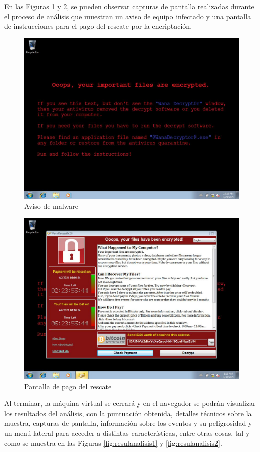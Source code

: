 En las Figuras \ref{fig:avisomalware} y \ref{fig:pagorescate}, se pueden observar capturas de pantalla realizadas durante el proceso de análisis que muestran un aviso de equipo infectado y una pantalla de instrucciones para el pago del rescate por la encriptación.

\begin{figure}[h!]
\begin{center}
\includegraphics[width=0.72\linewidth]{images/wannacry1.jpg}
\end{center}
\caption{Aviso de malware}
\label{fig:avisomalware}
\end{figure}

\begin{figure}[h!]
\begin{center}
\includegraphics[width=0.72\linewidth]{images/wannacry2.jpg}
\end{center}
\caption{Pantalla de pago del rescate}
\label{fig:pagorescate}
\end{figure}

Al terminar, la máquina virtual se cerrará y en el navegador se podrán visualizar los resultados del análisis, con la puntuación obtenida, detalles técnicos sobre la muestra, capturas de pantalla, información sobre los eventos y su peligrosidad y un menú lateral para acceder a distintas características, entre otras cosas, tal y como se muestra en las Figuras \ref{fig:resulanalisis1} y \ref{fig:resulanalisis2}.

